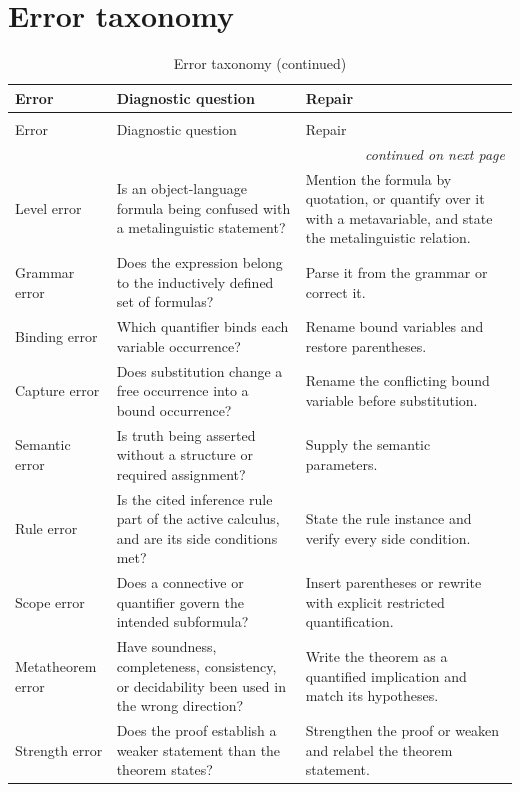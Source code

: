 \section{Error taxonomy}
\label{sec:writing-foundations-07}

\begin{longtable}{@{}p{}p{}p{}@{}}
\caption{Error taxonomy}\\
\toprule
Error & Diagnostic question & Repair \\
\midrule
\endfirsthead
\caption[]{Error taxonomy (continued)}\\
\toprule
Error & Diagnostic question & Repair \\
\midrule
\endhead
\midrule\multicolumn{3}{r}{\emph{continued on next page}}\\
\endfoot
\endlastfoot
Level error & Is an object-language formula being confused with a
metalinguistic statement? & Mention the formula by quotation, or quantify
over it with a metavariable, and state the metalinguistic relation. \\
\addlinespace
Grammar error & Does the expression belong to the inductively defined set of
formulas? & Parse it from the grammar or correct it. \\
\addlinespace
Binding error & Which quantifier binds each variable occurrence? & Rename bound
variables and restore parentheses. \\
\addlinespace
Capture error & Does substitution change a free occurrence into a bound
occurrence? & Rename the conflicting bound variable before substitution. \\
\addlinespace
Semantic error & Is truth being asserted without a structure or required
assignment? & Supply the semantic parameters. \\
\addlinespace
Rule error & Is the cited inference rule part of the active calculus, and are
its side conditions met? & State the rule instance and verify every side
condition. \\
\addlinespace
Scope error & Does a connective or quantifier govern the intended subformula? &
Insert parentheses or rewrite with explicit restricted quantification. \\
\addlinespace
Metatheorem error & Have soundness, completeness, consistency, or decidability
been used in the wrong direction? & Write the theorem as a quantified
implication and match its hypotheses. \\
\addlinespace
Strength error & Does the proof establish a weaker statement than the theorem
states? & Strengthen the proof or weaken and relabel the theorem statement. \\
\bottomrule
\end{longtable}

